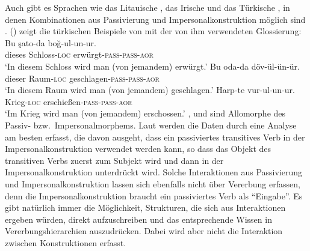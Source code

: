 Auch gibt es Sprachen wie das Litauische \citep[Abschnitt~5]{Timberlake82a}, das
Irische \citep{Noonan94a} und das Türkische \parencites{Ozkaragoez86a}[Abschnitt~2.3.3]{Knecht85a-u}, in denen Kombinationen aus Passivierung und
Impersonalkonstruktion möglich sind \citep{Blevins2003a}. () zeigt
die türkischen Beispiele von \citet[]{Ozkaragoez86a} mit der von ihm verwendeten
Glossierung:
\largerpage
\eal
\ex\label{ex-double-passivization-strangle}
\gll Bu şato-da boğ-ul-un-ur.\\
     dieses Schloss-\textsc{loc} erwürgt-\textsc{pass}-\textsc{pass}-\textsc{aor}\\
\glt `In diesem Schloss wird man (von jemandem) erwürgt.'
\ex\label{ex-double-passivization-hit}
\gll Bu oda-da döv-ül-ün-ür.\\
     dieser Raum-\textsc{loc} geschlagen-\textsc{pass}-\textsc{pass}-\textsc{aor}\\
\glt `In diesem Raum wird man (von jemandem) geschlagen.'
\ex
\gll Harp-te vur-ul-un-ur.\\
     Krieg-\textsc{loc} erschießen-\textsc{pass}-\textsc{pass}-\textsc{aor}\\
\glt `Im Krieg wird man (von jemandem) erschossen.'
\zl
{},  und  sind Allomorphe des Passiv- bzw.\ Impersonalmorphems.
Laut \citet{Blevins2003a} werden die Daten durch eine Analyse am besten erfasst, die davon ausgeht, dass ein passiviertes transitives
Verb in der Impersonalkonstruktion verwendet werden kann, so dass das Objekt des transitiven Verbs
zuerst zum Subjekt wird und dann in der Impersonalkonstruktion unterdrückt wird. Solche
Interaktionen aus Passivierung und Impersonalkonstruktion lassen sich ebenfalls nicht über Vererbung
erfassen, denn die Impersonalkonstruktion braucht ein passiviertes Verb als "`Eingabe"'. Es gibt
natürlich immer die Möglichkeit, Strukturen, die sich aus Interaktionen ergeben würden, direkt
aufzuschreiben und das entsprechende Wissen in Vererbungshierarchien auszudrücken. Dabei wird aber
nicht die Interaktion zwischen Konstruktionen erfasst.

